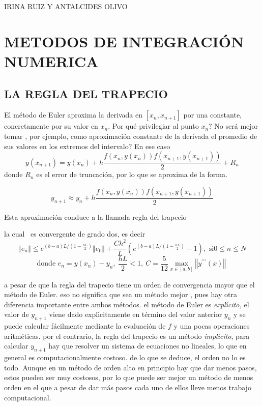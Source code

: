 \documentclass{article}%
\begin{document}
IRINA RUIZ Y ANTALCIDES OLIVO\bigskip

\section{METODOS DE INTEGRACI\'{O}N NUMERICA}

\subsection{LA REGLA DEL TRAPECIO}

El m\'{e}todo de Euler aproxima la derivada en $\left[  x_{n},x_{n+1}\right]
$ por una constante, concretamente por su valor en $x_{n}$. \textquestiondown
Por qu\'{e} privilegiar al punto $x_{n}?$ \textquestiondown No ser\'{a} mejor
tomar , por ejemplo, como aproximaci\'{o}n constante de la derivada el
promedio de sus valores en los extremos del intervalo? En ese caso
\[
y(x_{n+1})=y\left(  x_{n}\right)  +h\frac{f\left(  x_{n},y\left(
x_{n}\right)  \right)  f\left(  x_{n+1},y\left(  x_{n+1}\right)  \right)  }%
{2}+R_{n}%
\]
donde $R_{n}$ es el error de truncaci\'{o}n, por lo que se aproxima de la forma.%

\[
y_{n+1}\approx y_{n}+h\frac{f\left(  x_{n},y\left(  x_{n}\right)  \right)
f\left(  x_{n+1},y\left(  x_{n+1}\right)  \right)  }{2}%
\]

Esta aproximaci\'{o}n conduce a la llamada regla del trapecio

la cual \ es convergente de grado dos, es decir%
\[
\left\Vert e_{n}\right\Vert \leq e^{\left(  b-a\right)  L/\left(  1-\frac
{hL}{2}\right)  }\left\Vert e_{0}\right\Vert +\frac{Ch^{2}}{L}\left(
e^{\left(  b-a\right)  L/\left(  1-\frac{hL}{2}\right)  }-1\right)  ,\text{ si
}0\leq n\leq N
\]%
\[
\text{donde }e_{n}=y\left(  x_{n}\right)  -y_{n},\ \frac{hL}{2}<1,\ C=\frac
{5}{12}\max_{x\in\left[  a,b\right]  }\left\Vert y^{\prime\prime\prime}\left(
x\right)  \right\Vert \
\]

a pesar de que la regla del trapecio tiene un orden de convergencia mayor que
el m\'{e}todo de Euler. eso no significa que sea un m\'{e}todo mejor , pues
hay otra diferencia importante entre ambos m\'{e}todos. el m\'{e}todo de Euler
es \textit{expl\'{\i}cito,} el valor de $y_{n+1}$ viene dado
expl\'{\i}citamente en t\'{e}rmino del valor anterior $y_{n}$ y se puede
calcular f\'{a}cilmente mediante la evaluaci\'{o}n de $f$ y una pocas
operaciones aritm\'{e}ticas. por el contrario, la regla del trapecio es un
m\'{e}todo \textit{impl\'{\i}cito}, para calcular $y_{n+1}$ hay que resolver
un sistema de ecuaciones no lineales, lo que en general es computacionalmente
costoso. de lo que se deduce, el orden no lo es todo. Aunque en un m\'{e}todo
de orden alto en principio hay que dar menos pasos, estos pueden ser muy
costosos, por lo que puede ser mejor un m\'{e}todo de menos orden en el que a
pesar de dar m\'{a}s pasos cada uno de ellos lleve menos trabajo computacional.
\end{document}
